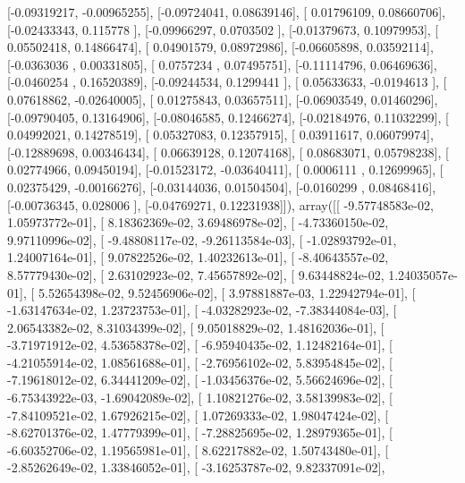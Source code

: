 \documentclass{article}
\begin{document}
       [-0.09319217, -0.00965255],
       [-0.09724041,  0.08639146],
       [ 0.01796109,  0.08660706],
       [-0.02433343,  0.115778  ],
       [-0.09966297,  0.0703502 ],
       [-0.01379673,  0.10979953],
       [ 0.05502418,  0.14866474],
       [ 0.04901579,  0.08972986],
       [-0.06605898,  0.03592114],
       [-0.0363036 ,  0.00331805],
       [ 0.0757234 ,  0.07495751],
       [-0.11114796,  0.06469636],
       [-0.0460254 ,  0.16520389],
       [-0.09244534,  0.1299441 ],
       [ 0.05633633, -0.0194613 ],
       [ 0.07618862, -0.02640005],
       [ 0.01275843,  0.03657511],
       [-0.06903549,  0.01460296],
       [-0.09790405,  0.13164906],
       [-0.08046585,  0.12466274],
       [-0.02184976,  0.11032299],
       [ 0.04992021,  0.14278519],
       [ 0.05327083,  0.12357915],
       [ 0.03911617,  0.06079974],
       [-0.12889698,  0.00346434],
       [ 0.06639128,  0.12074168],
       [ 0.08683071,  0.05798238],
       [ 0.02774966,  0.09450194],
       [-0.01523172, -0.03640411],
       [ 0.0006111 ,  0.12699965],
       [ 0.02375429, -0.00166276],
       [-0.03144036,  0.01504504],
       [-0.0160299 ,  0.08468416],
       [-0.00736345,  0.028006  ],
       [-0.04769271,  0.12231938]]), array([[ -9.57748583e-02,   1.05973772e-01],
       [  8.18362369e-02,   3.69486978e-02],
       [ -4.73360150e-02,   9.97110996e-02],
       [ -9.48808117e-02,  -9.26113584e-03],
       [ -1.02893792e-01,   1.24007164e-01],
       [  9.07822526e-02,   1.40232613e-01],
       [ -8.40643557e-02,   8.57779430e-02],
       [  2.63102923e-02,   7.45657892e-02],
       [  9.63448824e-02,   1.24035057e-01],
       [  5.52654398e-02,   9.52456906e-02],
       [  3.97881887e-03,   1.22942794e-01],
       [ -1.63147634e-02,   1.23723753e-01],
       [ -4.03282923e-02,  -7.38344084e-03],
       [  2.06543382e-02,   8.31034399e-02],
       [  9.05018829e-02,   1.48162036e-01],
       [ -3.71971912e-02,   4.53658378e-02],
       [ -6.95940435e-02,   1.12482164e-01],
       [ -4.21055914e-02,   1.08561688e-01],
       [ -2.76956102e-02,   5.83954845e-02],
       [ -7.19618012e-02,   6.34441209e-02],
       [ -1.03456376e-02,   5.56624696e-02],
       [ -6.75343922e-03,  -1.69042089e-02],
       [  1.10821276e-02,   3.58139983e-02],
       [ -7.84109521e-02,   1.67926215e-02],
       [  1.07269333e-02,   1.98047424e-02],
       [ -8.62701376e-02,   1.47779399e-01],
       [ -7.28825695e-02,   1.28979365e-01],
       [ -6.60352706e-02,   1.19565981e-01],
       [  8.62217882e-02,   1.50743480e-01],
       [ -2.85262649e-02,   1.33846052e-01],
       [ -3.16253787e-02,   9.82337091e-02],
\end{document}
